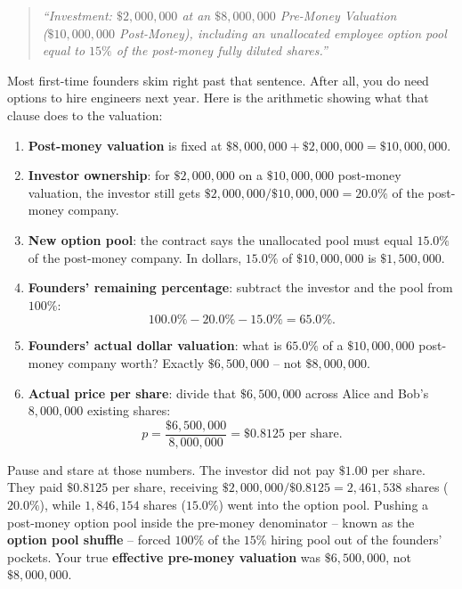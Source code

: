 \begin{quote}
\emph{``Investment: $\$2{,}000{,}000$ at an $\$8{,}000{,}000$ Pre-Money Valuation \\
($\$10{,}000{,}000$ Post-Money), including an unallocated employee option pool \\
equal to $15\%$ of the post-money fully diluted shares.''}
\end{quote}

Most first-time founders skim right past that sentence. After all, you do need options to hire engineers next year. Here is the arithmetic showing what that clause does to the valuation:

\begin{enumerate}
  \item \textbf{Post-money valuation} is fixed at $\$8{,}000{,}000 + \$2{,}000{,}000 = \$10{,}000{,}000$.
  \item \textbf{Investor ownership}: for $\$2{,}000{,}000$ on a $\$10{,}000{,}000$ post-money valuation, the investor still gets $\$2{,}000{,}000 / \$10{,}000{,}000 = 20.0\%$ of the post-money company.
  \item \textbf{New option pool}: the contract says the unallocated pool must equal $15.0\%$ of the post-money company. In dollars, $15.0\%$ of $\$10{,}000{,}000$ is $\$1{,}500{,}000$.
  \item \textbf{Founders' remaining percentage}: subtract the investor and the pool from $100\%$:
  \[
    100.0\% - 20.0\% - 15.0\% = 65.0\%.
  \]
  \item \textbf{Founders' actual dollar valuation}: what is $65.0\%$ of a $\$10{,}000{,}000$ post-money company worth? Exactly \textbf{$\$6{,}500{,}000$} -- not $\$8{,}000{,}000$.
  \item \textbf{Actual price per share}: divide that $\$6{,}500{,}000$ across Alice and Bob's $8{,}000{,}000$ existing shares:
  \[
    p = \frac{\$6{,}500{,}000}{8{,}000{,}000} = \$0.8125 \text{ per share.}
  \]
\end{enumerate}

Pause and stare at those numbers. The investor did not pay $\$1.00$ per share. They paid $\$0.8125$ per share, receiving $\$2{,}000{,}000 / \$0.8125 = 2{,}461{,}538$ shares ($20.0\%$), while $1{,}846{,}154$ shares ($15.0\%$) went into the option pool. Pushing a post-money option pool inside the pre-money denominator -- known as the \textbf{option pool shuffle} -- forced $100\%$ of the $15\%$ hiring pool out of the founders' pockets. Your true \textbf{effective pre-money valuation} was $\$6{,}500{,}000$, not $\$8{,}000{,}000$.

